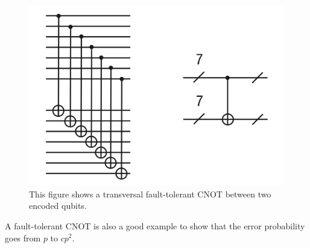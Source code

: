 \begin{figure}[h!]
    \centering
    \includegraphics[scale=0.5]{Mainmatter/images/Transversal_CNOT.png}
    \caption{This figure shows a transversal fault-tolerant CNOT between two encoded qubits.}
    \label{fig:TransCNOT}
\end{figure}
A fault-tolerant CNOT is also a good example to show that the error probability goes from $p$ to $cp^2$.

